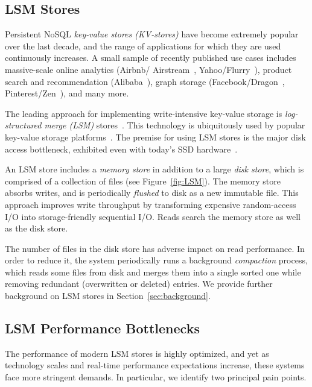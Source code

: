 
\subsection{LSM Stores} 
Persistent NoSQL \emph{key-value stores (KV-stores)} 
have become extremely popular over the last decade, 
and the range of applications for which they are used continuously increases. A small sample of  recently 
published use cases includes massive-scale online analytics (Airbnb/ Airstream~\cite{airbnb}, 
Yahoo/Flurry~\cite{flurry}), product search 
and recommendation (Alibaba~\cite{alibabahbase}), 
graph storage (Facebook/Dragon~\cite{dragon}, 
Pinterest/Zen~\cite{zen}), and many more. 

The leading approach for implementing write-intensive key-value storage is \emph{log-structured merge (LSM)} stores~\cite{O'Neil1996}.
This technology is ubiquitously used by popular key-value storage platforms~\cite{leveldb, rocksdb, scylladb, Chang2008, cassandra, hbase, mongodb, mysql}. 
The premise for using LSM stores is the major disk access bottleneck, exhibited even with today's SSD hardware~\cite{rocksdb,Tanenbaum:2014:MOS:2655363,Wu:2012:AWB:2093139.2093140}. 

An LSM store includes a \emph{memory store} in addition to a large \emph{disk store},
which is comprised of a collection of files
(see Figure~\ref{fig:LSM}). 
The memory store absorbs writes, and is periodically \emph{flushed} to disk as a new immutable file. 
This approach improves write throughput by transforming expensive random-access I/O into storage-friendly sequential I/O. 
Reads search the memory store as well as the disk store. 

The number of files in the disk store has adverse impact on read performance. 
In order to reduce it, the system periodically runs a background \emph{compaction} process, which reads some files from 
disk and merges them into a single sorted one while removing redundant (overwritten or deleted) entries.
We provide further background on LSM stores in Section~\ref{sec:background}.

\subsection{LSM Performance Bottlenecks} 
The performance of modern LSM stores is highly optimized, and yet as technology scales and real-time 
performance expectations increase, these systems face more stringent  demands. 
In particular, we identify two principal pain points. 

